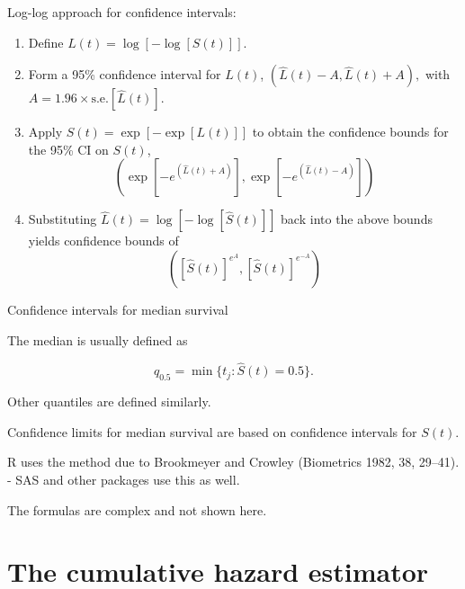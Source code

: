 \documentclass[ignorenonframetext,]{beamer}
\begin{document}
\begin{frame}{%
\protect\hypertarget{log-log-approach-for-confidence-intervals}{%
Log-log approach for confidence intervals:}}

\begin{enumerate}
[1.]
\item
  Define \(L(t) = \log[-\log[S(t)]]\).
\item
  Form a 95\% confidence interval for \(L(t)\),
  \((\widehat{L}(t)-A,\widehat{L}(t)+A),\) with
  \(A= 1.96 \times \text{s.e.}[\widehat{L}(t)].\)
\item
  Apply \(S(t)=\exp[-\exp[L(t)]]\) to obtain the confidence bounds for
  the 95\% CI on \(S(t)\), \[
  \left( \exp[-e^{(\widehat{L}(t)+A)}],\exp[-e^{(\widehat{L}(t)-A)}]\right)
  \]
\item
  Substituting \(\widehat{L}(t)=\log[-\log[\widehat{S}(t)]]\) back into
  the above bounds yields confidence bounds of \[
  \left([\widehat{S}(t)]^{e^A},[\widehat{S}(t)]^{e^{-A}}\right)
  \]
\end{enumerate}

\end{frame}

\begin{frame}{%
\protect\hypertarget{confidence-intervals-for-median-survival}{%
Confidence intervals for median survival}}

The median is usually defined as

\[
    q_{0.5} = \min\{t_j: \widehat{S}(t) = 0.5\}.
\]

Other quantiles are defined similarly.

Confidence limits for median survival are based on confidence intervals
for \(S(t)\).

R uses the method due to Brookmeyer and Crowley (Biometrics 1982, 38,
29–41).\\
- SAS and other packages use this as well.

The formulas are complex and not shown here.

\end{frame}

\hypertarget{the-cumulative-hazard-estimator}{%
\section{The cumulative hazard
estimator}\label{the-cumulative-hazard-estimator}}
\end{document}
